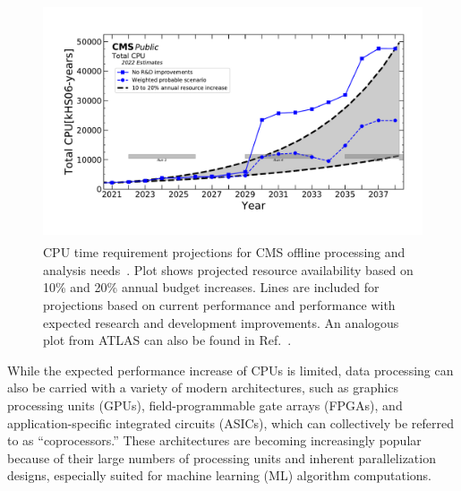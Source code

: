 \begin{figure}[htp]
    \centering
    \includegraphics[height=7cm,trim={0 1cm 0 1cm},clip]{plots/cpu_cms2022_vectorized.pdf}
    \caption{CPU time requirement projections for CMS offline processing and analysis needs~\cite{CMS_computing_plot, CMS:2815292}. Plot shows projected resource availability based on 10\% and 20\% annual budget increases. Lines are included for projections based on current performance and performance with expected research and development improvements. An analogous plot from ATLAS can also be found in Ref.~\cite{ATLAS_computing_plot}. }
    \label{fig:CPU_needs}
\end{figure}

\begin{sloppypar}While the expected performance increase of CPUs is limited, data processing can also be carried with a variety of modern architectures, such as graphics processing units (GPUs), field-programmable gate arrays (FPGAs), and application-specific integrated circuits (ASICs), which can collectively be referred to as ``coprocessors.'' These architectures are becoming increasingly popular because of their large numbers of processing units and inherent parallelization designs, especially suited for machine learning (ML) algorithm computations.\end{sloppypar} 

